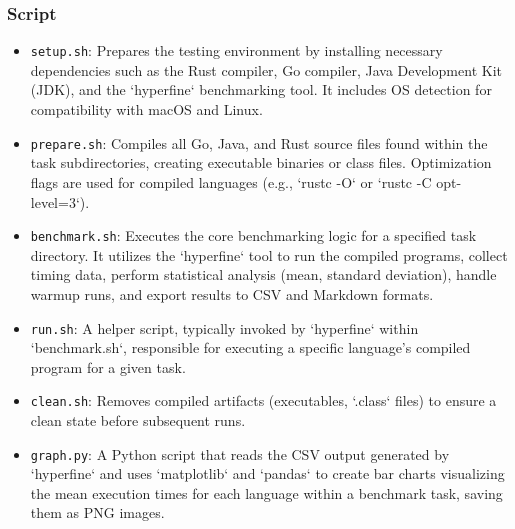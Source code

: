 \subsubsection{Script}
\begin{itemize}
    \item \texttt{setup.sh}: Prepares the testing environment by installing necessary dependencies such as the Rust compiler, Go compiler, Java Development Kit (JDK), and the `hyperfine` benchmarking tool. It includes OS detection for compatibility with macOS and Linux.
    \item \texttt{prepare.sh}: Compiles all Go, Java, and Rust source files found within the task subdirectories, creating executable binaries or class files. Optimization flags are used for compiled languages (e.g., `rustc -O` or `rustc -C opt-level=3`).
    \item \texttt{benchmark.sh}: Executes the core benchmarking logic for a specified task directory. It utilizes the `hyperfine` tool to run the compiled programs, collect timing data, perform statistical analysis (mean, standard deviation), handle warmup runs, and export results to CSV and Markdown formats.
    \item \texttt{run.sh}: A helper script, typically invoked by `hyperfine` within `benchmark.sh`, responsible for executing a specific language's compiled program for a given task.
    \item \texttt{clean.sh}: Removes compiled artifacts (executables, `.class` files) to ensure a clean state before subsequent runs.
    \item \texttt{graph.py}: A Python script that reads the CSV output generated by `hyperfine` and uses `matplotlib` and `pandas` to create bar charts visualizing the mean execution times for each language within a benchmark task, saving them as PNG images.
\end{itemize}